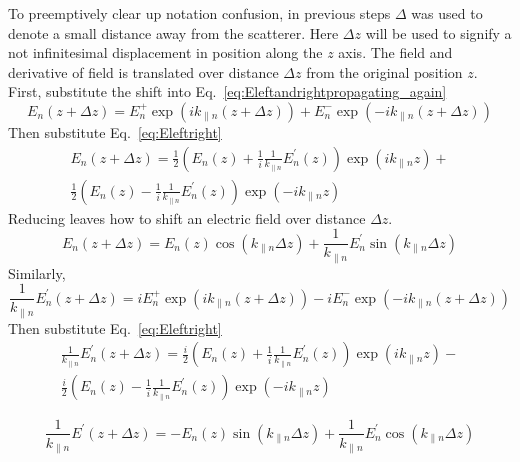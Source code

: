 To preemptively clear up notation confusion, in previous steps $\Delta$ was used to denote a small distance away from the scatterer. Here $\Delta z$ will be used to signify a not infinitesimal displacement in position along the $z$ axis. The field and derivative of field is translated over distance $\Delta z$ from the original position $z$. First, substitute the shift into Eq.~\ref{eq:Eleftandrightpropagating_again}
\begin{equation}
E_n(z+\Delta z) = E_n^+ \exp(i k_{\parallel n} (z+\Delta z)) + E_n^- \exp(-i k_{\parallel n} (z+\Delta z)) 
\end{equation}
Then substitute Eq.~\ref{eq:Eleftright}
\begin{equation}
\begin{gathered}
E_n(z+\Delta z) = \frac{1}{2} \left( E_n(z) + \frac{1}{i} \frac{1}{k_{\parallel n}} E_n^{\prime}(z) \right) \exp(i k_{\parallel n} z) + \\
\frac{1}{2} \left( E_n(z) - \frac{1}{i} \frac{1}{k_{\parallel n}} E_n^{\prime}(z) \right) \exp(-i k_{\parallel n} z) 
\end{gathered}
\end{equation}
Reducing leaves how to shift an electric field over distance $\Delta z$.
\begin{equation}
E_n(z+\Delta z) =E_n(z) \cos(k_{\parallel n} \Delta z) + \frac{1}{k_{\parallel n}} E_n^{\prime} \sin(k_{\parallel n} \Delta z) 
\label{eq:open_channel_field_transfer}
\end{equation}
Similarly,
\begin{equation}
\frac{1}{k_{\parallel n}} E_n^{\prime}(z+\Delta z) = i E_n^+ \exp(i k_{\parallel n} (z+\Delta z)) -i E_n^- \exp(-i k_{\parallel n} (z+\Delta z))
\end{equation}
Then substitute Eq.~\ref{eq:Eleftright}
\begin{equation}
\begin{gathered}
\frac{1}{k_{\parallel n}} E_n^{\prime}(z+\Delta z) =
\frac{i}{2} \left( E_n(z) + \frac{1}{i} \frac{1}{k_{\parallel n}} E_n^{\prime}(z) \right) \exp(i k_{\parallel n} z) -\\
\frac{i}{2} \left( E_n(z) - \frac{1}{i} \frac{1}{k_{\parallel n}} E_n^{\prime}(z) \right) \exp(-i k_{\parallel n} z) 
\end{gathered}
\end{equation}

\begin{equation}
\frac{1}{k_{\parallel n}} E^{\prime}(z+\Delta z)=- E_n(z) \sin(k_{\parallel n} \Delta z) + \frac{1}{k_{\parallel n}} E_n^{\prime} \cos(k_{\parallel n} \Delta z) 
\label{eq:open_channel_deriv_transfer}
\end{equation}

